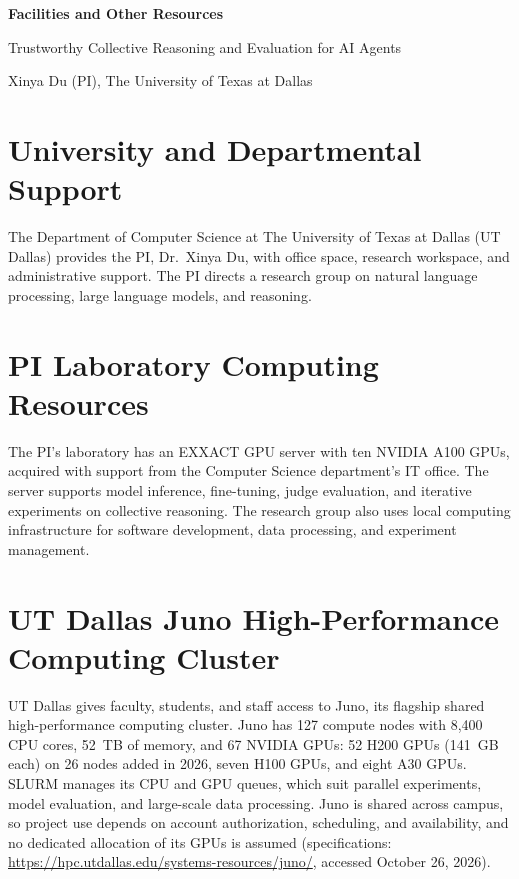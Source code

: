 \documentclass[12pt,letterpaper]{article}
\begin{document}
\begin{center}
{\large\bfseries Facilities and Other Resources\par}
\vspace{3pt}
Trustworthy Collective Reasoning and Evaluation for AI Agents\par
Xinya Du (PI), The University of Texas at Dallas\par
\end{center}

\section*{University and Departmental Support}
The Department of Computer Science at The University of Texas at Dallas (UT Dallas) provides the PI, Dr.\ Xinya Du, with office space, research workspace, and administrative support. The PI directs a research group on natural language processing, large language models, and reasoning.

\section*{PI Laboratory Computing Resources}
The PI's laboratory has an EXXACT GPU server with ten NVIDIA A100 GPUs, acquired with support from the Computer Science department's IT office. The server supports model inference, fine-tuning, judge evaluation, and iterative experiments on collective reasoning. The research group also uses local computing infrastructure for software development, data processing, and experiment management.

\section*{UT Dallas Juno High-Performance Computing Cluster}
UT Dallas gives faculty, students, and staff access to Juno, its flagship shared high-performance computing cluster. Juno has 127 compute nodes with 8,400 CPU cores, 52~TB of memory, and 67 NVIDIA GPUs: 52 H200 GPUs (141~GB each) on 26 nodes added in 2026, seven H100 GPUs, and eight A30 GPUs. SLURM manages its CPU and GPU queues, which suit parallel experiments, model evaluation, and large-scale data processing. Juno is shared across campus, so project use depends on account authorization, scheduling, and availability, and no dedicated allocation of its GPUs is assumed (specifications: \url{https://hpc.utdallas.edu/systems-resources/juno/}, accessed October 26, 2026).
\end{document}
